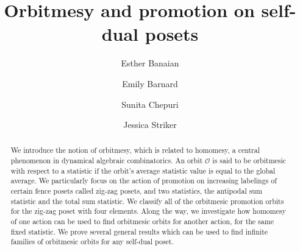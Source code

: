 \documentclass[11pt]{amsart}
\title{Orbitmesy and promotion on self-dual posets}
\author{Esther Banaian}
\author{Emily Barnard}
\author{Sunita Chepuri}
\author{Jessica Striker}
\theoremstyle{definition}
\begin{document}
\begin{abstract}
We introduce the notion of orbitmesy, which is related to  homomesy, a central phenomenon in dynamical algebraic combinatorics.
An orbit $\mathcal{O}$ is said to be orbitmesic with respect to a statistic if the orbit's average statistic value is equal to the global average.
We particularly focus on the action of promotion on increasing labelings of certain fence posets called zig-zag posets, and two statistics, the antipodal sum statistic and the total sum statistic.
We classify all of the orbitmesic promotion orbits for the zig-zag poset with four elements.
Along the way, we investigate how homomesy of one action can be used to find orbitmesic orbits for another action, for the same fixed statistic.
We prove several general results which can be used to find infinite families of orbitmesic orbits for any self-dual poset.
\end{abstract}

\maketitle



\end{document}
